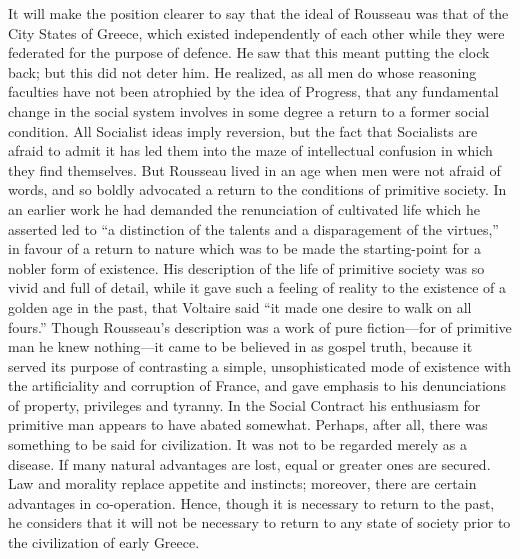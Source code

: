 \documentclass{book}
\begin{document}
It will make the position clearer to say that the ideal of Rousseau was that of the City States of Greece, which existed independently of each other while they were federated for the purpose of defence. He saw that this meant putting the clock back; but this did not deter him. He realized, as all men do whose reasoning faculties have not been atrophied by the idea of Progress, that any fundamental change in the social system involves in some degree a return to a former social condition. All Socialist ideas imply reversion, but the fact that Socialists are afraid to admit it has led them into the maze of intellectual confusion in which they find themselves. But Rousseau lived in an age when men were not afraid of words, and so boldly advocated a return to the conditions of primitive society. In an earlier work he had demanded the renunciation of cultivated life which he asserted led to “a distinction of the talents and a disparagement of the virtues,” in favour of a return to nature which was to be made the starting-point for a nobler form of existence. His description of the life of primitive society was so vivid and full of detail, while it gave such a feeling of reality to the existence of a golden age in the past, that Voltaire said “it made one desire to walk on all fours.” Though Rousseau’s description was a work of pure fiction—for of primitive man he knew nothing—it came to be believed in as gospel truth, because it served its purpose of contrasting a simple, unsophisticated mode of existence with the artificiality and corruption of France, and gave emphasis to his denunciations of property, privileges and tyranny. In the Social Contract his enthusiasm for primitive man appears to have abated somewhat. Perhaps, after all, there was something to be said for civilization. It was not to be regarded merely as a disease. If many natural advantages are lost, equal or greater ones are secured. Law and morality replace appetite and instincts; moreover, there are certain advantages in co-operation. Hence, though it is necessary to return to the past, he considers that it will not be necessary to return to any state of society prior to the civilization of early Greece.
\end{document}
